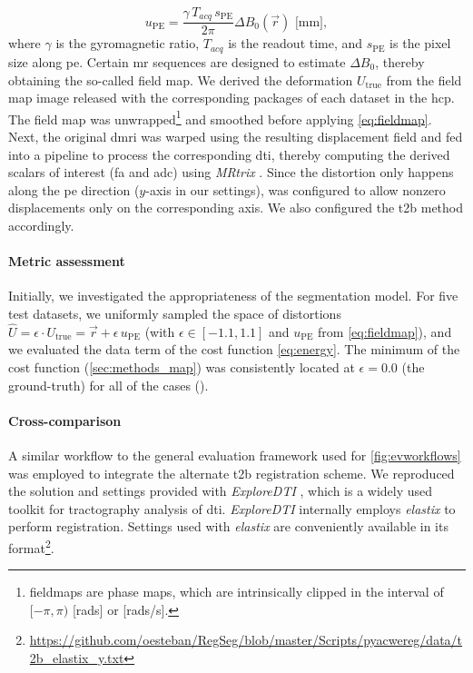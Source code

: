   \begin{equation}
  u_\text{PE} = \frac{\gamma \, T_{acq}\, s_\text{PE}}{2\pi}\Delta B_0(\vec{r})\text{ [mm]},
  \label{eq:fieldmap}
  \end{equation}
where $\gamma$ is the gyromagnetic ratio, $T_{acq}$ is the readout time, and
  $s_\text{PE}$ is the pixel size along \gls*{pe}.
Certain \gls*{mr} sequences are designed to estimate $\Delta B_0$, thereby obtaining
  the so-called field map.
We derived the deformation $U_\text{true}$ from the field map image released with
  the corresponding packages of each dataset in the \gls*{hcp}.
The field map was unwrapped\footnote{fieldmaps are phase maps, which are intrinsically clipped in the interval
  of $[-\pi, \pi)$ [rads] or [rads/s].} and smoothed before applying \eqref{eq:fieldmap}.
Next, the original \gls*{dmri} was warped using the resulting displacement field and fed into
  a pipeline to process the corresponding \gls*{dti}, thereby computing the derived scalars of
  interest (\gls*{fa} and \gls*{adc}) using \emph{MRtrix} \citep{tournier_mrtrix_2012}.
Since the distortion only happens along the \gls*{pe} direction ($y$-axis in our settings),
  \regseg{} was configured to allow nonzero displacements only on the corresponding axis.
We also configured the \gls*{t2b} method accordingly.

\paragraph*{Metric assessment}
Initially, we investigated the appropriateness of the segmentation model.
For five test datasets, we uniformly sampled the space of distortions
  $\hat{U} = \epsilon \cdot U_\text{true} = \vec{r} + \epsilon \, u_\text{PE}$
  (with $\epsilon \in [-1.1, 1.1]$ and $u_\text{PE}$ from \eqref{eq:fieldmap}),
  and we evaluated the data term of the cost function \eqref{eq:energy}.
The minimum of the cost function (\autoref{sec:methods_map}) was consistently located at
  $\epsilon=0.0$ (the ground-truth) for all of the cases ().

\paragraph*{Cross-comparison}
A similar workflow to the general evaluation framework used for \autoref{fig:evworkflows}
  was employed to integrate the alternate \gls*{t2b} registration scheme.
We reproduced the solution and settings provided with \emph{ExploreDTI}
  \citep{leemans_exploredti_2009}, which is a widely used toolkit for tractography analysis of
  \gls*{dti}.
\emph{ExploreDTI} internally employs \emph{elastix} \citep{klein_elastix_2010} to
  perform registration.
Settings used with \emph{elastix} are conveniently available in its format\footnote{\url{https://github.com/oesteban/RegSeg/blob/master/Scripts/pyacwereg/data/t2b_elastix_y.txt}}.

